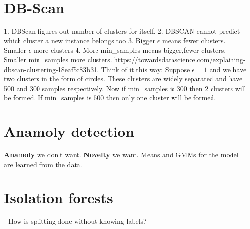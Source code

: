 \documentclass{article}
\begin{document}
\section{DB-Scan}
1. DBScan figures out number of clusters for itself.
2. DBSCAN cannot predict which cluster a new instance belongs too
3. Bigger $\epsilon$ means fewer clusters. Smaller $\epsilon$ more clusters
4. More min\_samples means bigger,fewer clusters. Smaller min\_samples more clusters. \url{https://towardsdatascience.com/explaining-dbscan-clustering-18eaf5c83b31}. Think of it this way: Suppose $\epsilon=1$ and we have two clusters in the form of circles. These clusters are widely separated and have 500 and 300 samples respectively. Now if min\_samples is 300 then 2 clusters will be formed. If min\_samples is 500 then only one cluster will be formed. 

\section{Anamoly detection}
\textbf{Anamoly} we don't want. \textbf{Novelty} we want. Means and GMMs for the model are learned from the data.

\section{Isolation forests}
- How is splitting done without knowing labels?
\end{document}
